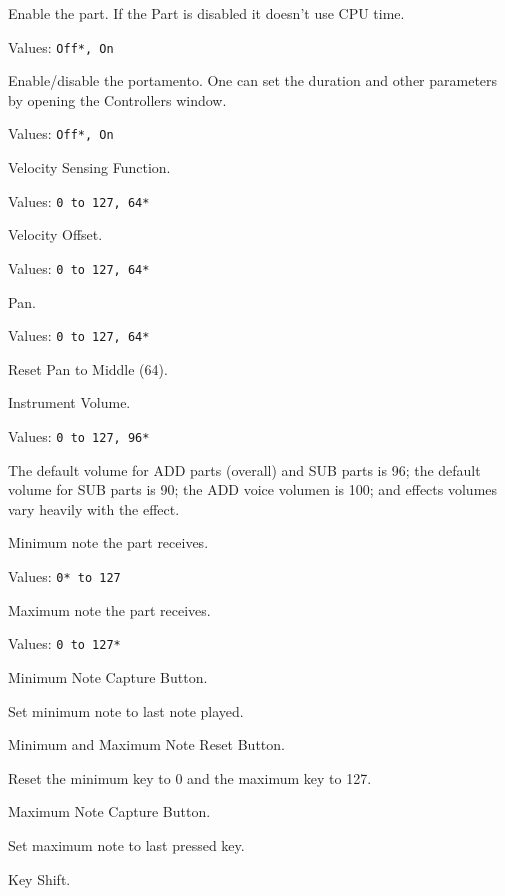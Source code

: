    Enable the part. If the Part is disabled it doesn't use CPU time.

   Values: \texttt{Off*, On}

   Enable/disable the portamento.
   One can set the duration and other parameters by opening the Controllers
   window.

   Values: \texttt{Off*, On}

   Velocity Sensing Function.

   Values: \texttt{0 to 127, 64*}

   Velocity Offset.

   Values: \texttt{0 to 127, 64*}

   Pan.

   Values: \texttt{0 to 127, 64*}

   Reset Pan to Middle (64).

   Instrument Volume.

   Values: \texttt{0 to 127, 96*}
 
   The default volume for ADD parts (overall) and SUB parts is 96; the
   default volume for SUB parts is 90; the ADD voice volumen is 100; and
   effects volumes vary heavily with the effect.

   Minimum note the part receives.

   Values: \texttt{0* to 127}

   Maximum note the part receives.

   Values: \texttt{0 to 127*}

   Minimum Note Capture Button.

   Set minimum note to last note played.

   Minimum and Maximum Note Reset Button.

   Reset the minimum key to 0 and the maximum key to 127.

   Maximum Note Capture Button.

   Set maximum note to last pressed key.

   Key Shift.

